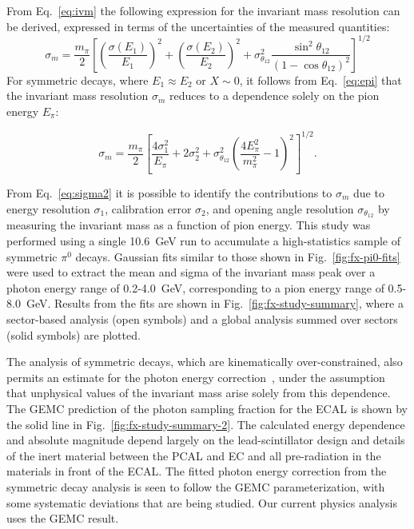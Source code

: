 From Eq.~\ref{eq:ivm} the following expression for the invariant mass resolution can be derived, expressed in
terms of the uncertainties of the measured quantities:
\begin{equation}
  \sigma_m \!\!=\!\! \frac{m_{\pi}}{2}\left[\left(\frac{\sigma(E_1)}{E_1}\right)^2 \!\!+\!\!
    \left(\frac{\sigma(E_2)}{E_2}\right)^2 \!\!
    + \sigma^2_{\theta_{12}}\frac{\sin^2 \theta_{12}}{(1-\cos \theta_{12})^2}\right]^{1/2}
\label{eq:sigmam1}
\end{equation}
For symmetric decays, where $E_1 \approx E_2$ or $X\sim 0$, it follows from Eq.~\ref{eq:epi} that the invariant
mass resolution $\sigma_m$ reduces to a dependence solely on the pion energy $E_{\pi}$:

\begin{equation}
  \sigma_m = \frac{m_\pi}{2}\left[\frac{4 \sigma^2_1}{E_\pi} + 2 \sigma^2_2 +
    \sigma^2_{\theta_{12}}\left(\frac{4 E^2_\pi}{m^2_\pi}-1\right)^2\right]^{1/2}.
\label{eq:sigma2}
\end{equation}

From Eq.~\ref{eq:sigma2} it is possible to identify the contributions to $\sigma_m$ due to energy resolution
$\sigma_1$, calibration error $\sigma_2$, and opening angle resolution $\sigma_{\theta_{12}}$ by measuring the
invariant mass as a function of pion energy. This study was performed using a single 10.6~GeV run to accumulate
a high-statistics sample of symmetric $\pi^{0}$ decays. Gaussian fits similar to those shown in
Fig.~\ref{fig:fx-pi0-fits} were used to extract the mean and sigma of the invariant mass peak over a photon energy
range of 0.2-4.0~GeV, corresponding to a pion energy range of 0.5-8.0~GeV. Results from the fits are shown in
Fig.~\ref{fig:fx-study-summary}, where a sector-based analysis (open symbols) and a global analysis summed over
sectors (solid symbols) are plotted.  

The analysis of symmetric decays, which are kinematically over-constrained, also permits an estimate for the photon
energy correction~\cite{2006015}, under the assumption that unphysical values of the invariant mass arise solely
from this dependence. The GEMC prediction of the photon sampling fraction for the ECAL is shown by the solid line
in Fig.~\ref{fig:fx-study-summary-2}. The calculated energy dependence and absolute magnitude depend largely on
the lead-scintillator design and details of the inert material between the PCAL and EC and all pre-radiation in the
materials in front of the ECAL. The fitted photon energy correction from the symmetric decay analysis is seen to
follow the GEMC parameterization, with some systematic deviations that are being studied. Our current physics
analysis uses the GEMC result.

